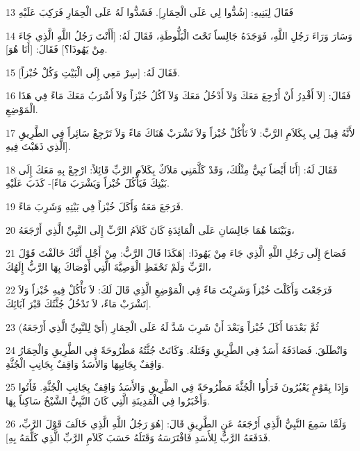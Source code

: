 \par 13 فَقَالَ لِبَنِيهِ: [شُدُّوا لِي عَلَى الْحِمَارِ]. فَشَدُّوا لَهُ عَلَى الْحِمَارِ فَرَكِبَ عَلَيْهِ
\par 14 وَسَارَ وَرَاءَ رَجُلِ اللَّهِ، فَوَجَدَهُ جَالِساً تَحْتَ الْبَلُّوطَةِ، فَقَالَ لَهُ: [أَأَنْتَ رَجُلُ اللَّهِ الَّذِي جَاءَ مِنْ يَهُوذَا؟] فَقَالَ: [أَنَا هُوَ].
\par 15 فَقَالَ لَهُ: [سِرْ مَعِي إِلَى الْبَيْتِ وَكُلْ خُبْزاً].
\par 16 فَقَالَ: [لاَ أَقْدِرُ أَنْ أَرْجِعَ مَعَكَ وَلاَ أَدْخُلُ مَعَكَ وَلاَ آكُلُ خُبْزاً وَلاَ أَشْرَبُ مَعَكَ مَاءً فِي هَذَا الْمَوْضِعِ.
\par 17 لأَنَّهُ قِيلَ لِي بِكَلاَمِ الرَّبِّ: لاَ تَأْكُلْ خُبْزاً وَلاَ تَشْرَبْ هُنَاكَ مَاءً وَلاَ تَرْجِعْ سَائِراً فِي الطَّرِيقِ الَّذِي ذَهَبْتَ فِيهِ].
\par 18 فَقَالَ لَهُ: [أَنَا أَيْضاً نَبِيٌّ مِثْلُكَ، وَقَدْ كَلَّمَنِي مَلاَكٌ بِكَلاَمِ الرَّبِّ قَائِلاً: ارْجِعْ بِهِ مَعَكَ إِلَى بَيْتِكَ فَيَأْكُلَ خُبْزاً وَيَشْرَبَ مَاءً]- كَذَبَ عَلَيْهِ.
\par 19 فَرَجَعَ مَعَهُ وَأَكَلَ خُبْزاً فِي بَيْتِهِ وَشَرِبَ مَاءً.
\par 20 وَبَيْنَمَا هُمَا جَالِسَانِ عَلَى الْمَائِدَةِ كَانَ كَلاَمُ الرَّبِّ إِلَى النَّبِيِّ الَّذِي أَرْجَعَهُ،
\par 21 فَصَاحَ إِلَى رَجُلِ اللَّهِ الَّذِي جَاءَ مِنْ يَهُوذَا: [هَكَذَا قَالَ الرَّبُّ: مِنْ أَجْلِ أَنَّكَ خَالَفْتَ قَوْلَ الرَّبِّ وَلَمْ تَحْفَظِ الْوَصِيَّةَ الَّتِي أَوْصَاكَ بِهَا الرَّبُّ إِلَهُكَ،
\par 22 فَرَجَعْتَ وَأَكَلْتَ خُبْزاً وَشَرِبْتَ مَاءً فِي الْمَوْضِعِ الَّذِي قَالَ لَكَ: لاَ تَأْكُلْ فِيهِ خُبْزاً وَلاَ تَشْرَبْ مَاءً، لاَ تَدْخُلُ جُثَّتُكَ قَبْرَ آبَائِكَ].
\par 23 ثُمَّ بَعْدَمَا أَكَلَ خُبْزاً وَبَعْدَ أَنْ شَرِبَ شَدَّ لَهُ عَلَى الْحِمَارِ (أَيْ لِلنَّبِيِّ الَّذِي أَرْجَعَهُ)
\par 24 وَانْطَلَقَ. فَصَادَفَهُ أَسَدٌ فِي الطَّرِيقِ وَقَتَلَهُ. وَكَانَتْ جُثَّتُهُ مَطْرُوحَةً فِي الطَّرِيقِ وَالْحِمَارُ وَاقِفٌ بِجَانِبِهَا وَالأَسَدُ وَاقِفٌ بِجَانِبِ الْجُثَّةِ.
\par 25 وَإِذَا بِقَوْمٍ يَعْبُرُونَ فَرَأُوا الْجُثَّةَ مَطْرُوحَةً فِي الطَّرِيقِ وَالأَسَدُ وَاقِفٌ بِجَانِبِ الْجُثَّةِ. فَأَتُوا وَأَخْبَرُوا فِي الْمَدِينَةِ الَّتِي كَانَ النَّبِيُّ الشَّيْخُ سَاكِناً بِهَا.
\par 26 وَلَمَّا سَمِعَ النَّبِيُّ الَّذِي أَرْجَعَهُ عَنِ الطَّرِيقِ قَالَ: [هُوَ رَجُلُ اللَّهِ الَّذِي خَالَفَ قَوْلَ الرَّبِّ، فَدَفَعَهُ الرَّبُّ لِلأَسَدِ فَافْتَرَسَهُ وَقَتَلَهُ حَسَبَ كَلاَمِ الرَّبِّ الَّذِي كَلَّمَهُ بِهِ].
